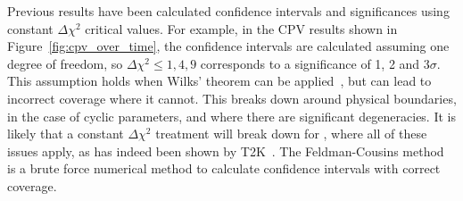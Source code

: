 Previous results have been calculated confidence intervals and significances using constant $\Delta\chi^{2}$ critical values. For example, in the CPV results shown in Figure~\ref{fig:cpv_over_time}, the confidence intervals are calculated assuming one degree of freedom, so $\Delta\chi^{2} \leq 1, 4, 9$ corresponds to a significance of 1, 2 and 3$\sigma$. This assumption holds when Wilks' theorem can be applied~\cite{wilks}, but can lead to incorrect coverage where it cannot. This breaks down around physical boundaries, in the case of cyclic parameters, and where there are significant degeneracies. It is likely that a constant $\Delta\chi^{2}$ treatment will break down for \deltacp, where all of these issues apply, as has indeed been shown by T2K~\cite{Abe:2021gky}. The Feldman-Cousins method~\cite{Feldman:1997qc} is a brute force numerical method to calculate confidence intervals with correct coverage.

